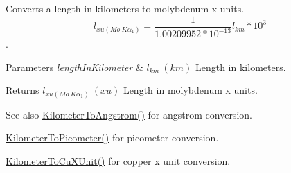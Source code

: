 Converts a length in kilometers to molybdenum x units. \[ l_{xu(Mo\ K\alpha_1)}=\frac{1}{1.00209952*10^{-13}} l_{km} * 10^{3}\]. 


\begin{DoxyParams}{Parameters}
{\em length\+In\+Kilometer} & $ l_{km}\ (km)$ Length in kilometers. \\
\hline
\end{DoxyParams}
\begin{DoxyReturn}{Returns}
$ l_{xu(Mo\ K\alpha_1)}\ (xu)$ Length in molybdenum x units. 
\end{DoxyReturn}
\begin{DoxySeeAlso}{See also}
\mbox{\hyperlink{group___e_g_x_math-_conversions-_length_conversions-_s_i-_kilometer-_non-_s_i_ga415a412a1b03916d6071a206a3318035}{Kilometer\+To\+Angstrom()}} for angstrom conversion. 

\mbox{\hyperlink{group___e_g_x_math-_conversions-_length_conversions-_s_i-_kilometer-_s_i_ga73f6e033de3c41892f06cde1862f68d6}{Kilometer\+To\+Picometer()}} for picometer conversion. 

\mbox{\hyperlink{group___e_g_x_math-_conversions-_length_conversions-_s_i-_kilometer-_non-_s_i_ga0614eb6a9e8bf1a9ba6cf51121f22083}{Kilometer\+To\+Cu\+X\+Unit()}} for copper x unit conversion. 
\end{DoxySeeAlso}
